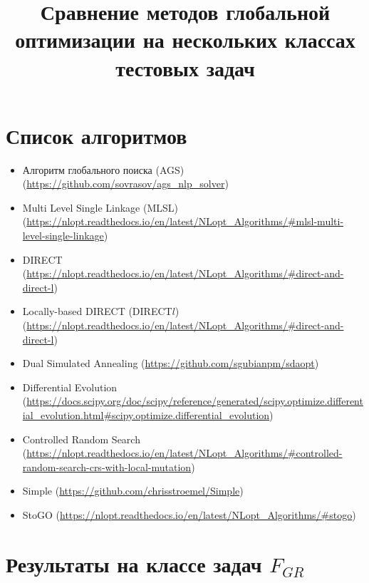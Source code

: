 \documentclass[a4paper]{article}
\begin{document}
\title{Сравнение методов глобальной оптимизации на нескольких классах тестовых задач}
\author{}
\date{}
\maketitle

\section{Список алгоритмов}
\begin{itemize}
  \item Алгоритм глобального поиска (AGS) (\url{https://github.com/sovrasov/ags_nlp_solver})
  \item Multi Level Single Linkage (MLSL) (\url{https://nlopt.readthedocs.io/en/latest/NLopt_Algorithms/#mlsl-multi-level-single-linkage})
  \item DIRECT (\url{https://nlopt.readthedocs.io/en/latest/NLopt_Algorithms/#direct-and-direct-l})
  \item Locally-based DIRECT (DIRECT$l$) (\url{https://nlopt.readthedocs.io/en/latest/NLopt_Algorithms/#direct-and-direct-l})
  \item Dual Simulated Annealing (\url{https://github.com/sgubianpm/sdaopt})
  \item Differential Evolution (\url{https://docs.scipy.org/doc/scipy/reference/generated/scipy.optimize.differential_evolution.html#scipy.optimize.differential_evolution})
  \item Controlled Random Search (\url{https://nlopt.readthedocs.io/en/latest/NLopt_Algorithms/#controlled-random-search-crs-with-local-mutation})
  \item Simple (\url{https://github.com/chrisstroemel/Simple})
  \item StoGO (\url{https://nlopt.readthedocs.io/en/latest/NLopt_Algorithms/#stogo})

\end{itemize}

\section{Результаты на классе задач $F_{GR}$}
\end{document}
